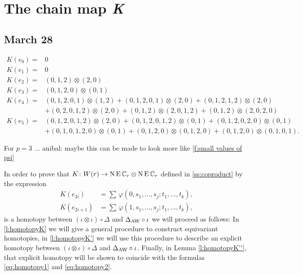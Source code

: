
\appendix
\newpage
\section{The chain map \textit{K}}\label{s:chain homotopy K}

\subsection{March 28}

\begin{table}
	\begin{align*}
		K(e_0) =& 0 \\
		K(e_1) =& 0 \\
		K(e_2) =& (0,1,2)\otimes(2,0) \\
		K(e_3) =& (0,1,2,0)\otimes (0,1) \\
		K(e_4) =& (0,1,2,0,1)\otimes (1,2) + (0,1,2,0,1)\otimes (2,0) + (0,1,2,1,2)\otimes(2,0)  \\
		&+ (0,2,0,1,2)\otimes(2,0) + (0,1,2)\otimes (2,0,1,2) + (0,1,2)\otimes (2,0,2,0) \\
		K(e_5) =& (0,1,2,0,1,2)\otimes (2,0) + (0,1,2,0,1,2)\otimes (0,1) + (0,1,2,0,2,0)\otimes(0,1)  \\
		&+ (0,1,0,1,2,0)\otimes(0,1) + (0,1,2,0)\otimes (0,1,2,0) + (0,1,2,0)\otimes (0,1,0,1).
	\end{align*}
	\caption{For $p=3$ ... anibal: maybe this can be made to look more like \cref{f:small values of psi}}
\end{table}

In order to prove that $K \colon W(r) \to \operatorname{N}\operatorname{E}\mathbb{C}_r \otimes \operatorname{N}\operatorname{E}\mathbb{C}_r$ defined in \cref{ss:coproduct} by the expression
\begin{align}
	\label{eq:homotopy1}
	K(e_{2i})   &= \sum \, \varphi(0,s_1,\dots,s_j;t_1,\dots,t_k), \\
	\label{eq:homotopy2}
	K(e_{2i+1}) &= \sum \, \varphi(1,s_1,\dots,s_j;t_1,\dots,t_k),
\end{align}
is a homotopy between $(\iota\otimes \iota)\circ \Delta$ and $\Delta_{\operatorname{AW}}\circ \iota$ we will proceed as follows: In \cref{l:homotopyK} we will give a general procedure to construct equivariant homotopies, in \cref{l:homotopyK'} we will use this procedure to describe an explicit homotopy between $(\iota\otimes \iota)\circ \Delta$ and $\Delta_{\operatorname{AW}}\circ \iota$. Finally, in Lemma \ref{l:homotopyK''}, that explicit homotopy will be shown to coincide with the formulas \eqref{eq:homotopy1} and \eqref{eq:homotopy2}.


